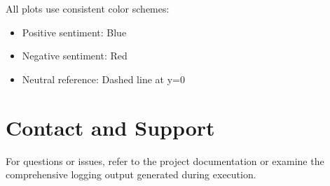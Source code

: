 \documentclass[11pt]{article}
\begin{document}
All plots use consistent color schemes:
\begin{itemize}
    \item Positive sentiment: Blue
    \item Negative sentiment: Red
    \item Neutral reference: Dashed line at y=0
\end{itemize}

\section{Contact and Support}

For questions or issues, refer to the project documentation or examine the comprehensive logging output generated during execution.
\end{document}
